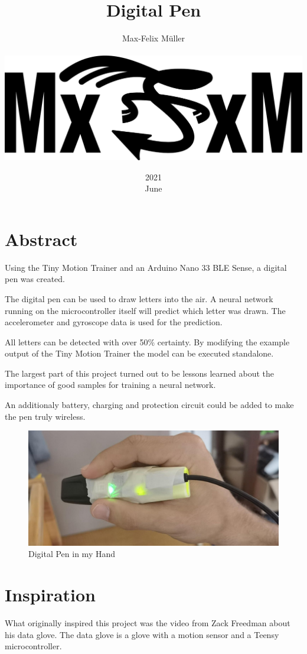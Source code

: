 \documentclass[a4paper,titlepage]{article}
\title{Digital Pen}
\date{2021\\ June}
\author{Max-Felix Müller\\ \\ \includegraphics[width=\textwidth]{mxfxm.png}}
\begin{document}
\maketitle
\tableofcontents
\newpage
\listoffigures %
\newpage

\section*{Abstract}

Using the Tiny Motion Trainer and an Arduino Nano 33 BLE Sense, a digital pen was created.

The digital pen can be used to draw letters into the air.
A neural network running on the microcontroller itself will predict which letter was drawn.
The accelerometer and gyroscope data is used for the prediction.

All letters can be detected with over 50\% certainty.
By modifying the example output of the Tiny Motion Trainer the model can be executed standalone.

The largest part of this project turned out to be lessons learned about the importance of good samples for training a neural network.

An additionaly battery, charging and protection circuit could be added to make the pen truly wireless.

\begin{figure}[H]
    \includegraphics[width=\textwidth]{pen_in_hand.jpg}
    \caption{Digital Pen in my Hand}
\end{figure}

\newpage
\section{Inspiration}

What originally inspired this project was the video from Zack Freedman about his data glove.
The data glove is a glove with a motion sensor and a Teensy microcontroller.
\end{document}

